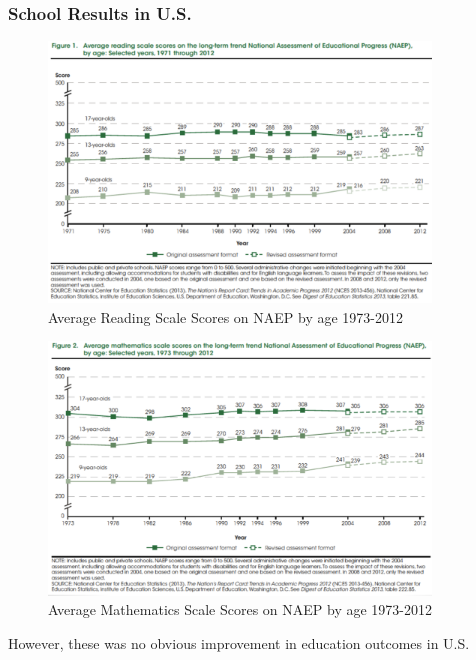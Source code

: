         \subsubsection{School Results in U.S.}
            \begin{figure}[H]
                \centering
                \includegraphics[width=4in]{images/ch9/9 us result 1.png}
                \caption{Average Reading Scale Scores on NAEP by age 1973-2012}
            \end{figure}
            \begin{figure}[H]
                \centering
                \includegraphics[width=4in]{images/ch9/9 us result 2.png}
                \caption{Average Mathematics Scale Scores on NAEP by age 1973-2012}
            \end{figure}
            However, these was no obvious improvement in education outcomes in U.S.
        

